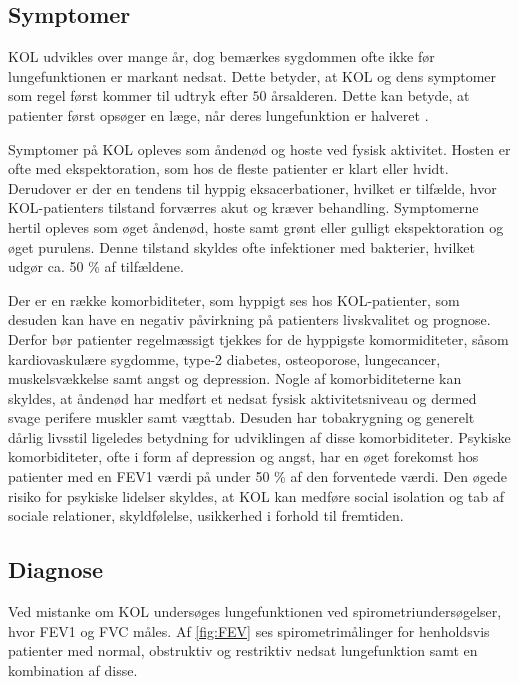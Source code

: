 \subsection{Symptomer}
KOL udvikles over mange år, dog bemærkes sygdommen ofte ikke før lungefunktionen er markant nedsat. Dette betyder, at KOL og dens symptomer som regel først kommer til udtryk efter $50$ årsalderen\cite{Lange2015}. Dette kan betyde, at patienter først opsøger en læge, når deres lungefunktion er halveret \cite{dsam2016}.

Symptomer på KOL opleves som åndenød og hoste ved fysisk aktivitet. Hosten er ofte med ekspektoration, som hos de fleste patienter er klart eller hvidt.\cite{Basisbogen2016} Derudover er der en tendens til hyppig eksacerbationer, hvilket er tilfælde, hvor KOL-patienters tilstand forværres akut og kræver behandling. Symptomerne hertil opleves som øget åndenød, hoste samt grønt eller gulligt ekspektoration og øget purulens. Denne tilstand skyldes ofte infektioner med bakterier, hvilket udgør ca. 50 \% af tilfældene.\cite{Basisbogen2016, dsam2016} 

Der er en række komorbiditeter, som hyppigt ses hos KOL-patienter, som desuden kan have en negativ påvirkning på patienters livskvalitet og prognose. Derfor bør patienter regelmæssigt tjekkes for de hyppigste komormiditeter, såsom kardiovaskulære sygdomme, type-2 diabetes, osteoporose, lungecancer, muskelsvækkelse samt angst og depression.
Nogle af komorbiditeterne kan skyldes, at åndenød har medført et nedsat fysisk aktivitetsniveau og dermed svage perifere muskler samt vægttab. Desuden har tobakrygning og generelt dårlig livsstil ligeledes betydning for udviklingen af disse komorbiditeter. \cite{dsam2016, McCarthy2015}
Psykiske komorbiditeter, ofte i form af depression og angst, har en øget forekomst hos patienter med en FEV1 værdi på under 50 \% af den forventede værdi. Den øgede risiko for psykiske lidelser skyldes, at KOL kan medføre social isolation og tab af sociale relationer, skyldfølelse, usikkerhed i forhold til fremtiden. \cite{dsam2016}


\subsection{Diagnose}
Ved mistanke om KOL undersøges lungefunktionen ved spirometriundersøgelser, hvor FEV1 og FVC måles. Af \autoref{fig:FEV} ses spirometrimålinger for henholdsvis patienter med normal, obstruktiv og restriktiv nedsat lungefunktion samt en kombination af disse.\cite{Basisbogen2016, Sundhed2013}

